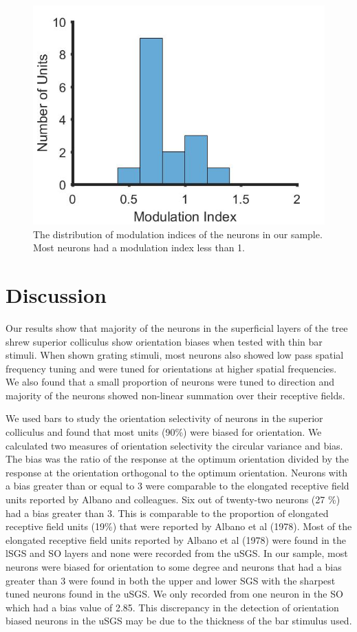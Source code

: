 	\begin{figure}[H]
		\includegraphics[width=\linewidth]{superiorcolliculus/modulation_index.jpg}
		\caption{The distribution of modulation indices of the neurons in our sample. Most neurons had a modulation index less than 1.}
		\label{fig:sc_mi}			
	\end{figure}
	\pagebreak
	\section{Discussion}
	Our results show that majority of the neurons in the superficial layers of the tree shrew superior colliculus show orientation biases when tested with thin bar stimuli. When shown grating stimuli, most neurons also showed low pass spatial frequency tuning and were tuned for orientations at higher spatial frequencies. We also found that a small proportion of neurons were tuned to direction and majority of the neurons showed non-linear summation over their receptive fields.
	
	We used bars to study the orientation selectivity of neurons in the superior colliculus and found that most units (90\%) were biased for orientation. We calculated two measures of orientation selectivity the circular variance and bias. The bias was the ratio of the response at the optimum orientation divided by the response at the orientation orthogonal to the optimum orientation. Neurons with a bias greater than or equal to 3 were comparable to the elongated receptive field units reported by Albano and colleagues. Six out of twenty-two neurons (27 \%) had a bias greater than 3. This is comparable to the proportion of elongated receptive field units (19\%) that were reported by Albano et al (1978). Most of the elongated receptive field units reported by Albano et al (1978) were found in the lSGS and SO layers and none were recorded from the uSGS. In our sample, most neurons were biased for orientation to some degree and neurons that had a bias greater than 3 were found in both the upper and lower SGS with the sharpest tuned neurons found in the uSGS. We only recorded from one neuron in the SO which had a bias value of 2.85. This discrepancy in the detection of orientation biased neurons in the uSGS may be due to the thickness of the bar stimulus used.
	
